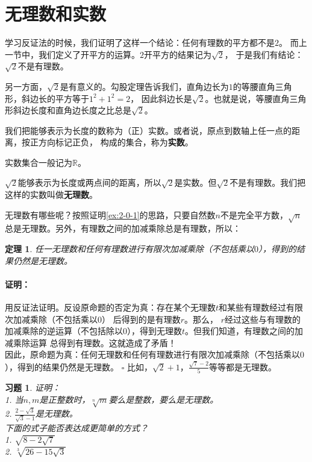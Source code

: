 \documentclass[12pt,UTF8]{ctexbook}
\newtheorem{tm}{定理}[section]
\newenvironment{proof2}{\paragraph{\textbf{证明：}}}{\hfill$\square$}
\newtheorem{xt}{习题}[section]
\begin{document}
\section{无理数和实数}
学习反证法的时候，我们证明了这样一个结论：任何有理数的平方都不是$2$。
而上一节中，我们定义了开平方的运算。$2$开平方的结果记为$\sqrt{2}$，
于是我们有结论：$\sqrt{2}$不是有理数。

另一方面，$\sqrt{2}$是有意义的。勾股定理告诉我们，直角边长为$1$的等腰直角三角形，斜边长的平方等于$1^2+1^2=2$，
因此斜边长是$\sqrt{2}$。也就是说，等腰直角三角形斜边长度和直角边长度之比总是$\sqrt{2}$。

我们把能够表示为长度的数称为（正）实数。或者说，原点到数轴上任一点的距离，按正方向标记正负，
构成的集合，称为\textbf{实数}。

实数集合一般记为$\mathbb{R}$。

$\sqrt{2}$能够表示为长度或两点间的距离，所以$\sqrt{2}$是实数。但$\sqrt{2}$不是有理数。我们把这样的实数叫做\textbf{无理数}。

无理数有哪些呢？按照证明\ref{ex:2-0-1}的思路，只要自然数$n$不是完全平方数，$\sqrt{n}$总是无理数。另外，有理数之间的加减乘除总是有理数，所以：
\begin{tm}\label{tm:3-1-0}
    任一无理数和任何有理数进行有限次加减乘除（不包括乘以$0$），得到的结果仍然是无理数。
\end{tm}
\begin{proof2}
    用反证法证明。反设原命题的否定为真：存在某个无理数$t$和某些有理数经过有限次加减乘除（不包括乘以$0$）
    后得到的是有理数$r$。那么，
    $r$经过这些与有理数的加减乘除的逆运算（不包括除以$0$），得到无理数$t$。但我们知道，有理数之间的加减乘除运算
    总得到有理数。这就造成了矛盾！\\
    因此，原命题为真：任何无理数和任何有理数进行有限次加减乘除（不包括乘以$0$），得到的结果仍然是无理数。
\end{proof2}
比如，$\sqrt{2}+1$，$\frac{\sqrt{7} - 2}{5}$等等都是无理数。

\begin{xt}\label{xt:3-1-0}
    证明：\\
    1. 当$n,m$是正整数时，$\sqrt[n]{m}$要么是整数，要么是无理数。\\
    2. $\frac{2 - \sqrt{3}}{\sqrt{3} - 1}$是无理数。\\
    下面的式子能否表达成更简单的方式？\\
    1. $\sqrt{8 - 2\sqrt{7}}$\\
    2. $\sqrt[3]{26 - 15\sqrt{3}}$
\end{xt}
\end{document}
